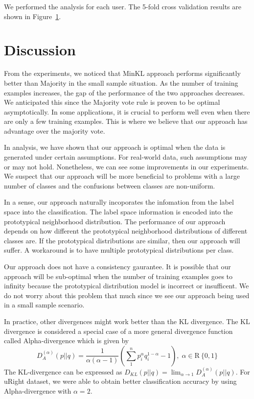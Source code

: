 \documentclass{article}
\begin{document}
We performed the analysis for each user. The 5-fold cross validation
results are shown in Figure~\ref{}.

\section{Discussion}

From the experiments, we noticed that MinKL approach performs
significantly better than Majority in the small sample situation. As
the number of training examples increases, the gap of the performance
of the two approaches decreases. We anticipated this since the
Majority vote rule is proven to be optimal asymptotically. In some
applications, it is crucial to perform well even when there are only a
few training examples. This is where we believe that our approach has
advantage over the majority vote.

In analysis, we have shown that our approach is optimal when the data
is generated under certain assumptions. For real-world data,
such assumptions may or may not hold. Nonetheless, we can see some
improvements in our experiments. We suspect that our approach will be
more beneficial to problems with a large number of classes and the
confusions between classes are non-uniform. 

In a sense, our approach naturally incoporates the infomation from the
label space into the classification. The label space information is
encoded into the prototypical neighborhood distribution. The
performance of our approach depends on how
different the prototypical neighborhood distributions of different
classes are. If the prototypical distributions are similar, then our
approach will suffer. A workaround is to have multiple prototypical
distributions per class. 

Our approach does not have a consistency gaurantee. It is
possible that our approach will be sub-optimal when the number of
training examples goes to infinity because the prototypical
distribution model is incorrect or insufficent. We do not worry
about this problem that much since we see our approach being used
in a small sample scenario.

In practice, other divergences might work better than the KL
divergence. The KL divergence is considered a special case of a
more general divergence function called Alpha-divergence which is
given by
\[
D^{(\alpha)}_A (p||q) = \frac{1}{\alpha(\alpha - 1)}\left( \sum_1^n
  p^{\alpha}_i q^{1-\alpha}_i - 1\right), \; \alpha \in \mathrm{R} \ \{0,1\}
\]
The KL-divergence can be expressed as $D_{KL} (p || q) = \lim_{\alpha
\rightarrow 1} D^{(\alpha)}_A (p || q)$. 
For uRight dataset, we were able to obtain better classification
accuracy by using Alpha-divergence with $\alpha = 2$.
\end{document}
